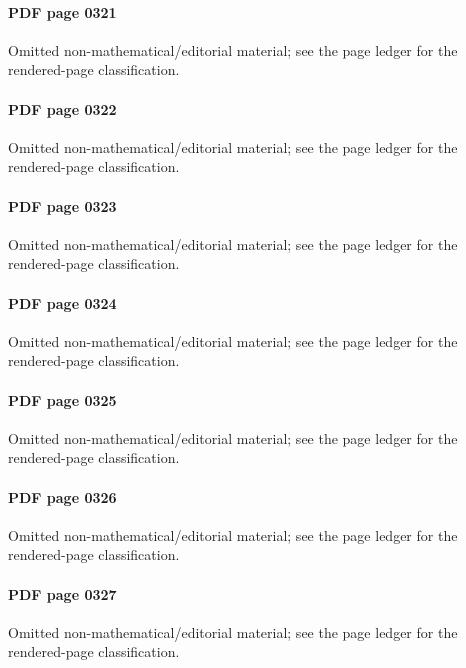 \paragraph{PDF page 0321}\uses{}\label{mcrt-omitted-p0321} Omitted non-mathematical/editorial material; see the page ledger for the rendered-page classification.\par
\paragraph{PDF page 0322}\uses{}\label{mcrt-omitted-p0322} Omitted non-mathematical/editorial material; see the page ledger for the rendered-page classification.\par
\paragraph{PDF page 0323}\uses{}\label{mcrt-omitted-p0323} Omitted non-mathematical/editorial material; see the page ledger for the rendered-page classification.\par
\paragraph{PDF page 0324}\uses{}\label{mcrt-omitted-p0324} Omitted non-mathematical/editorial material; see the page ledger for the rendered-page classification.\par
\paragraph{PDF page 0325}\uses{}\label{mcrt-omitted-p0325} Omitted non-mathematical/editorial material; see the page ledger for the rendered-page classification.\par
\paragraph{PDF page 0326}\uses{}\label{mcrt-omitted-p0326} Omitted non-mathematical/editorial material; see the page ledger for the rendered-page classification.\par
\paragraph{PDF page 0327}\uses{}\label{mcrt-omitted-p0327} Omitted non-mathematical/editorial material; see the page ledger for the rendered-page classification.\par
